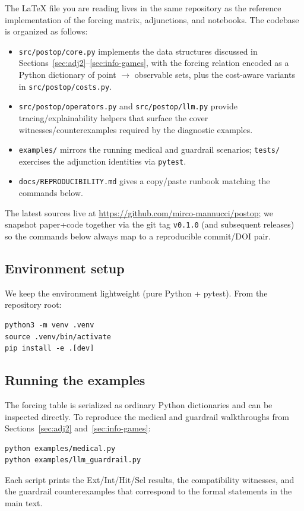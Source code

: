 \documentclass[11pt]{article}
\theoremstyle{definition}
\theoremstyle{plain}
\begin{document}
The LaTeX file you are reading lives in the same repository as the reference implementation of the forcing matrix, adjunctions, and notebooks.
The codebase is organized as follows:
\begin{itemize}
  \item \texttt{src/postop/core.py} implements the data structures discussed in Sections~\ref{sec:adj2}--\ref{sec:info-games}, with the forcing relation encoded as a Python dictionary of point $\to$ observable sets, plus the cost-aware variants in \texttt{src/postop/costs.py}.
  \item \texttt{src/postop/operators.py} and \texttt{src/postop/llm.py} provide tracing/explainability helpers that surface the cover witnesses/counterexamples required by the diagnostic examples.
  \item \texttt{examples/} mirrors the running medical and guardrail scenarios; \texttt{tests/} exercises the adjunction identities via \texttt{pytest}.
  \item \texttt{docs/REPRODUCIBILITY.md} gives a copy/paste runbook matching the commands below.
\end{itemize}
The latest sources live at \url{https://github.com/mirco-mannucci/postop}; we snapshot paper+code together via the git tag \texttt{v0.1.0} (and subsequent releases) so the commands below always map to a reproducible commit/DOI pair.

\subsection{Environment setup}

We keep the environment lightweight (pure Python + pytest). From the repository root:
\begin{verbatim}
python3 -m venv .venv
source .venv/bin/activate
pip install -e .[dev]
\end{verbatim}

\subsection{Running the examples}

The forcing table is serialized as ordinary Python dictionaries and can be inspected directly. To reproduce the medical and guardrail walkthroughs from Sections~\ref{sec:adj2} and~\ref{sec:info-games}:
\begin{verbatim}
python examples/medical.py
python examples/llm_guardrail.py
\end{verbatim}
Each script prints the Ext/Int/Hit/Sel results, the compatibility witnesses, and the guardrail counterexamples that correspond to the formal statements in the main text.
\end{document}
